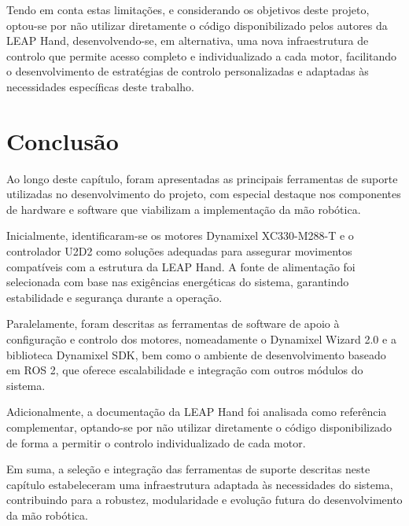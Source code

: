 Tendo em conta estas limitações, e considerando os objetivos deste projeto, optou-se por não utilizar diretamente o código disponibilizado pelos autores da LEAP Hand, desenvolvendo-se, em alternativa, uma nova infraestrutura de controlo que permite acesso completo e individualizado a cada motor, facilitando o desenvolvimento de estratégias de controlo personalizadas e adaptadas às necessidades específicas deste trabalho.





\section{Conclusão}

Ao longo deste capítulo, foram apresentadas as principais ferramentas de suporte utilizadas no desenvolvimento do projeto, com especial destaque nos componentes de hardware e software que viabilizam a implementação da mão robótica. 

Inicialmente, identificaram-se os motores Dynamixel XC330-M288-T e o controlador U2D2 como soluções adequadas para assegurar movimentos compatíveis com a estrutura da LEAP Hand. A fonte de alimentação foi selecionada com base nas exigências energéticas do sistema, garantindo estabilidade e segurança durante a operação.

Paralelamente, foram descritas as ferramentas de software de apoio à configuração e controlo dos motores, nomeadamente o Dynamixel Wizard 2.0 e a biblioteca Dynamixel SDK, bem como o ambiente de desenvolvimento baseado em ROS 2, que oferece escalabilidade e integração com outros módulos do sistema.

Adicionalmente, a documentação da LEAP Hand foi analisada como referência complementar, optando-se por não utilizar diretamente o código disponibilizado de forma a permitir o controlo individualizado de cada motor.

Em suma, a seleção e integração das ferramentas de suporte descritas neste capítulo estabeleceram uma infraestrutura adaptada às necessidades do sistema, contribuindo para a robustez, modularidade e evolução futura do desenvolvimento da mão robótica.

